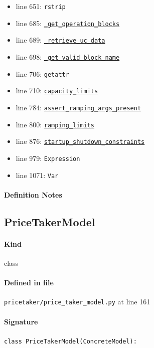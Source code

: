 \documentclass[11pt]{report}
\begin{document}
\begin{itemize}[leftmargin=*]
  \item line 651: \texttt{rstrip}
  \item line 685: \hyperref[def:pricetaker-price_taker_model.py:PriceTakerModel._get_operation_blocks:L445]{\texttt{\_get\_operation\_blocks}}
  \item line 689: \hyperref[def:pricetaker-price_taker_model.py:PriceTakerModel._retrieve_uc_data:L628]{\texttt{\_retrieve\_uc\_data}}
  \item line 698: \hyperref[def:pricetaker-price_taker_model.py:PriceTakerModel._get_valid_block_name:L645]{\texttt{\_get\_valid\_block\_name}}
  \item line 706: \texttt{getattr}
  \item line 710: \hyperref[def:pricetaker-unit_commitment.py:capacity_limits:L180]{\texttt{capacity\_limits}}
  \item line 784: \hyperref[def:pricetaker-unit_commitment.py:UnitCommitmentData.assert_ramping_args_present:L116]{\texttt{assert\_ramping\_args\_present}}
  \item line 800: \hyperref[def:pricetaker-unit_commitment.py:ramping_limits:L205]{\texttt{ramping\_limits}}
  \item line 876: \hyperref[def:pricetaker-unit_commitment.py:startup_shutdown_constraints:L137]{\texttt{startup\_shutdown\_constraints}}
  \item line 979: \texttt{Expression}
  \item line 1071: \texttt{Var}
\end{itemize}
\paragraph{Definition Notes}
\subsection{PriceTakerModel}
\label{def:pricetaker-price_taker_model.py:PriceTakerModel:L161}
\paragraph{Kind} class
\paragraph{Defined in file} \texttt{pricetaker/price\_taker\_model.py} at line 161
\paragraph{Signature} \texttt{class PriceTakerModel(ConcreteModel):}
\end{document}

